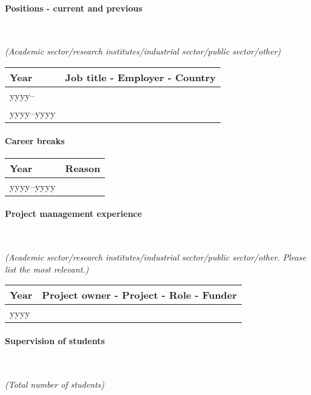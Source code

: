 \documentclass[cv,partner]{nfr}
\begin{document}
\paragraph{Positions - current and previous} ~

\noindent\textit{(Academic sector/research institutes/industrial sector/public
sector/other)}

\begin{longtable}{
| >{\raggedright}p{2.45cm} %
    | >{\raggedright\arraybackslash}p{13.65cm} | }
    \hline
    \rowcolor{nfrgray} Year & Job title - Employer - Country \\
    \hline
    yyyy-- & ~ \\
    \hline
    yyyy--yyyy & ~ \\
    \hline
\end{longtable}

\paragraph{Career breaks}
\begin{longtable}{
| >{\raggedright}p{2.45cm} %
    | >{\raggedright\arraybackslash}p{13.65cm} | }
    \hline
    \rowcolor{nfrgray} Year & Reason \\
    \hline
    yyyy--yyyy & ~ \\
    \hline
\end{longtable}

\paragraph{Project management experience} ~

\noindent\textit{(Academic sector/research institutes/industrial sector/public sector/other. Please list the most relevant.)}
\begin{longtable}{
| >{\raggedright}p{2.45cm} %
    | >{\raggedright\arraybackslash}p{13.65cm} | }
    \hline
    \rowcolor{nfrgray} Year & Project owner - Project - Role - Funder \\
    \hline
    yyyy & ~ \\
    \hline
\end{longtable}

\paragraph{Supervision of students} ~

\noindent\textit{(Total number of students)}
\end{document}
